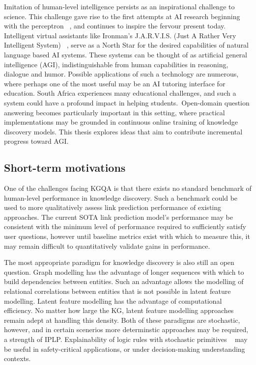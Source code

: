 Imitation of human-level intelligence persists as an inspirational challenge to science. This challenge gave rise to the first attempts at AI research beginning with the perceptron \unskip~\citep{rosenblatt1958perceptron}, and continues to inspire the fervour present today. Intelligent virtual assistants like Ironman's J.A.R.V.I.S. (Just A Rather Very Intelligent System) \unskip~\citep{jarvisIronmanWiki}, serve as a North Star for the desired capabilities of natural language based AI systems. These systems can be thought of as artificial general intelligence (AGI), indistinguishable from human capabilities in reasoning, dialogue and humor. Possible applications of such a technology are numerous, where perhaps one of the most useful may be an AI tutoring interface for education. South Africa experiences many educational challenges, and such a system could have a profound impact in helping students.\ Open-domain question answering becomes particularly important in this setting, where practical implementations may be grounded in continuous online training of knowledge discovery models. This thesis explores ideas that aim to contribute incremental progress toward AGI.  

\subsection{Short-term motivations}

One of the challenges facing KGQA is that there exists no standard benchmark of human-level performance in knowledge discovery. Such a benchmark could be used to more qualitatively assess link prediction performance of existing approaches. The current SOTA link prediction model's performance may be consistent with the minimum level of performance required to sufficiently satisfy user questions, however until baseline metrics exist with which to measure this, it may remain difficult to quantitatively validate gains in performance. \par

\noindent The most appropriate paradigm for knowledge discovery is also still an open question. Graph modelling has the advantage of longer sequences with which to build dependencies between entities. Such an advantage allows the modelling of relational correlations between entities that is not possible in latent feature modelling. Latent feature modelling has the advantage of computational efficiency. No matter how large the KG, latent feature modelling approaches remain adept at handling this density. Both of these paradigms are stochastic, however, and in certain scenerios more determinstic approaches may be required, a strength of IPLP. Explainability of logic rules with stochastic primitives \unskip~\citep{yang2017differentiable} may be useful in safety-critical applications, or under decision-making understanding contexts. \par

